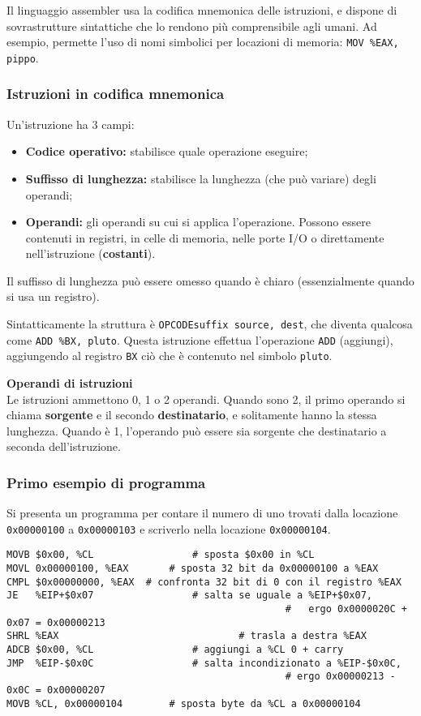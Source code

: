 \documentclass[a4paper,11pt]{article}
\begin{document}
Il linguaggio assembler usa la codifica mnemonica delle istruzioni, e dispone di sovrastrutture sintattiche che lo rendono più comprensibile agli umani.
Ad esempio, permette l'uso di nomi simbolici per locazioni di memoria: \lstinline|MOV %EAX, pippo|.

\subsubsection{Istruzioni in codifica mnemonica}
Un'istruzione ha 3 campi:
\begin{itemize}
	\item \textbf{Codice operativo:} stabilisce quale operazione eseguire;
	\item \textbf{Suffisso di lunghezza:} stabilisce la lunghezza (che può variare) degli operandi;	
	\item \textbf{Operandi:} gli operandi su cui si applica l'operazione. 
		Possono essere contenuti in registri, in celle di memoria, nelle porte I/O o direttamente nell'istruzione (\textbf{costanti}).
\end{itemize}

Il suffisso di lunghezza può essere omesso quando è chiaro (essenzialmente quando si usa un registro).

Sintatticamente la struttura è \lstinline|OPCODEsuffix source, dest|, che diventa qualcosa come \lstinline|ADD %BX, pluto|.
Questa istruzione effettua l'operazione \lstinline|ADD| (aggiungi), aggiungendo al registro \lstinline|BX| ciò che è contenuto nel simbolo \lstinline|pluto|.

\par\medskip
\noindent
\textsf{\textbf{Operandi di istruzioni}} \\
Le istruzioni ammettono 0, 1 o 2 operandi.
Quando sono 2, il primo operando si chiama \textbf{sorgente} e il secondo \textbf{destinatario}, e solitamente hanno la stessa lunghezza.
Quando è 1, l'operando può essere sia sorgente che destinatario a seconda dell'istruzione.

\subsubsection{Primo esempio di programma}

Si presenta un programma per contare il numero di uno trovati dalla locazione \lstinline|0x00000100| a \lstinline|0x00000103| e scriverlo nella locazione \lstinline|0x00000104|. 

\begin{lstlisting}[style=codestyle]	
MOVB $0x00, %CL					# sposta $0x00 in %CL
MOVL 0x00000100, %EAX		# sposta 32 bit da 0x00000100 a %EAX
CMPL $0x00000000, %EAX	# confronta 32 bit di 0 con il registro %EAX
JE   %EIP+$0x07					# salta se uguale a %EIP+$0x07, 
												#	ergo 0x0000020C + 0x07 = 0x00000213
SHRL %EAX								# trasla a destra %EAX
ADCB $0x00, %CL					# aggiungi a %CL 0 + carry 
JMP  %EIP-$0x0C					# salta incondizionato a %EIP-$0x0C,
												# ergo 0x00000213 - 0x0C = 0x00000207
MOVB %CL, 0x00000104		# sposta byte da %CL a 0x00000104
\end{lstlisting}
\end{document}
